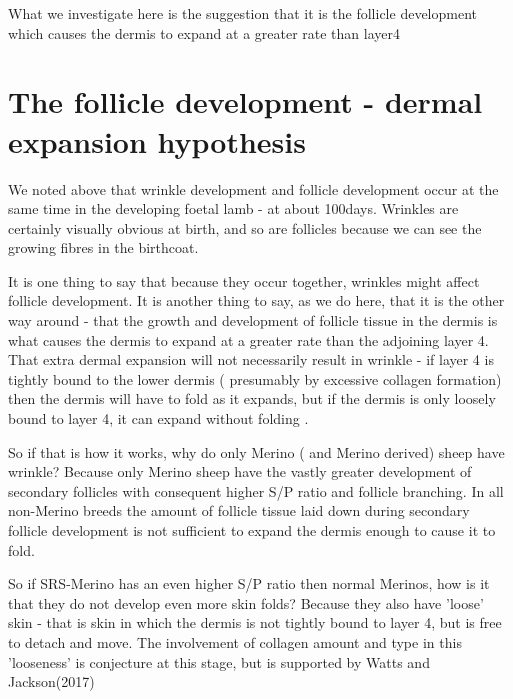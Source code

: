 \documentclass[titlepage]{article}  %
\begin{document}
What we investigate here is the suggestion that it is the follicle development which causes the dermis to expand at a greater rate than layer4



\section{The follicle development - dermal expansion hypothesis}
We noted above that wrinkle development and follicle development occur at the same time in the developing foetal lamb - at about 100days. Wrinkles are certainly visually obvious at birth, and so are follicles because we can see the growing fibres in the birthcoat.

It is one thing to say that because they occur together, wrinkles might affect follicle development. It is another thing to say, as we do here, that it is the other way around - that the growth and development of follicle tissue in the dermis is what causes the dermis to expand at a greater rate than the adjoining layer 4. That extra dermal expansion will not necessarily result in wrinkle - if layer 4 is tightly bound to the lower dermis ( presumably by excessive collagen formation) then the dermis will have to fold as it expands, but if the dermis is only loosely bound to layer 4, it can expand without folding .

So if that is how it works, why do only Merino ( and Merino derived) sheep have wrinkle? Because only Merino sheep have the vastly greater development of secondary follicles with consequent higher S/P ratio and follicle branching.  In all non-Merino breeds the amount of follicle tissue laid down during secondary follicle development is not sufficient to expand the dermis enough to cause it to fold. 

So if SRS-Merino has an even higher S/P ratio then normal Merinos, how is it that they do not develop even more skin folds? Because they also have 'loose' skin - that is skin in which the dermis is not tightly bound to layer 4, but is free to detach and move. The involvement of collagen amount and type in this 'looseness' is conjecture at this stage, but is supported by Watts and Jackson(2017)~\cite{watt:17b}
\end{document}
